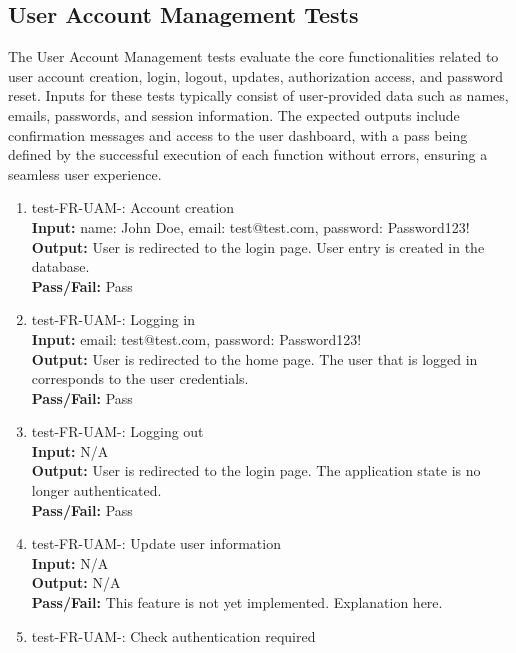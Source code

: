 \documentclass[12pt, titlepage]{article}
\begin{document}
\subsection{User Account Management Tests}
The User Account Management tests evaluate the core functionalities related to user 
account creation, login, logout, updates, authorization access, and password reset. Inputs 
for these tests typically consist of user-provided data such as names, emails, passwords, 
and session information. The expected outputs include confirmation messages and access to 
the user dashboard, with a pass being defined by the successful execution of each function 
without errors, ensuring a seamless user experience.

\begin{enumerate}
\item test-FR-UAM-: Account creation\\
  \textbf{Input:} name: John Doe, email: test@test.com, password: Password123!\\
  \textbf{Output:} User is redirected to the login page. User entry is created
  in the database.\\
  \textbf{Pass/Fail:} Pass\\
\item test-FR-UAM-: Logging in\\
  \textbf{Input:} email: test@test.com, password: Password123!\\
  \textbf{Output:} User is redirected to the home page. The user that is logged
  in corresponds to the user credentials.\\
  \textbf{Pass/Fail:} Pass\\
\item test-FR-UAM-: Logging out\\
  \textbf{Input:} N/A\\
  \textbf{Output:} User is redirected to the login page. The application state
  is no longer authenticated.\\
  \textbf{Pass/Fail:} Pass\\
\item test-FR-UAM-: Update user information\\
  \textbf{Input:} N/A\\
  \textbf{Output:} N/A\\
  \textbf{Pass/Fail:} This feature is not yet implemented. Explanation here.\\
\item test-FR-UAM-: Check authentication required\\

\end{enumerate}
\end{document}
